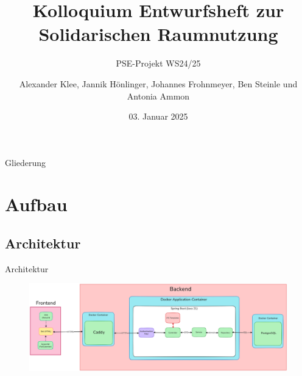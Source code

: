 \documentclass{sdqbeamer}
\title[Solidarische Raumnutzung Entwurfsheft]{Kolloquium Entwurfsheft zur Solidarischen Raumnutzung}
\author[Soli-Gruppe]{Alexander Klee, Jannik Hönlinger, Johannes Frohnmeyer, Ben Steinle und Antonia Ammon }
\subtitle{PSE-Projekt WS24/25}
\date[03.\,01.\,2025]{03. Januar 2025}
\begin{document}
 
\KITtitleframe

\begin{frame}{Gliederung}
\tableofcontents
\end{frame}

\section{Aufbau}

\subsection{Architektur}
\begin{frame}{Architektur}
\begin{figure}
    \centering
    \includegraphics[width=\textwidth]{pictures/figures/architecture}
    \label{fig:architektur}
\end{figure}
\end{frame}
\end{document}
